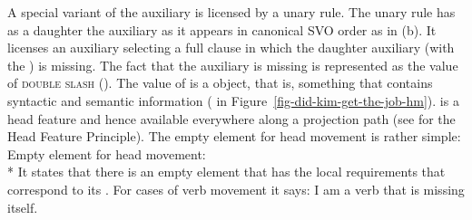 \documentclass[output=paper,biblatex,babelshorthands,newtxmath,draftmode,colorlinks,citecolor=brown]{langscibook}
\begin{document}
A special variant of the auxiliary is licensed by a unary rule. The unary rule has as a daughter the auxiliary as
it appears in canonical SVO order as in (b). It licenses an auxiliary selecting a full clause
in which the daughter auxiliary (with the \locv {}) is missing. The fact
that the auxiliary is missing is represented as the value of \textsc{double slash} (\dsl). The value of \dsl is a
 object, that is, something that contains syntactic and semantic information (
in Figure~\ref{fig-did-kim-get-the-job-hm}). \dsl is a head feature and hence available everywhere
along a projection path (see \crossrefchaptert[\page \pageref{page-hfp}]{properties} for the Head Feature
Principle). The empty element for head movement is rather simple:
\ea
Empty element for head movement:\\*
\z
It states that there is an empty element that has the local requirements that correspond to its
\dslv. For cases of verb movement it says: I am a verb that is missing itself. 
\end{document}
